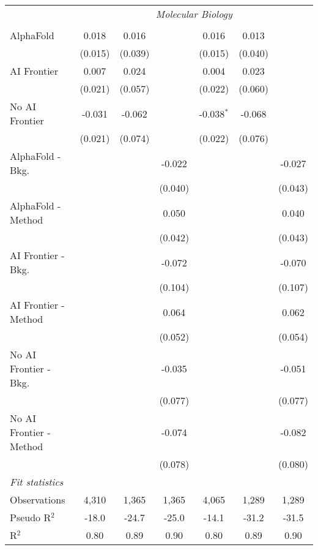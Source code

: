 \begin{tabular}{lcccccc}
 & \multicolumn{6}{c}{\textit{Molecular Biology}} \\ \\
   AlphaFold               & 0.018   & 0.016   &         & 0.016        & 0.013   &   \\   
                           & (0.015) & (0.039) &         & (0.015)      & (0.040) &   \\   
   AI Frontier             & 0.007   & 0.024   &         & 0.004        & 0.023   &   \\   
                           & (0.021) & (0.057) &         & (0.022)      & (0.060) &   \\   
   No AI Frontier          & -0.031  & -0.062  &         & -0.038$^{*}$ & -0.068  &   \\   
                           & (0.021) & (0.074) &         & (0.022)      & (0.076) &   \\   
   AlphaFold - Bkg.        &         &         & -0.022  &              &         & -0.027\\   
                           &         &         & (0.040) &              &         & (0.043)\\   
   AlphaFold - Method      &         &         & 0.050   &              &         & 0.040\\   
                           &         &         & (0.042) &              &         & (0.043)\\   
   AI Frontier - Bkg.      &         &         & -0.072  &              &         & -0.070\\   
                           &         &         & (0.104) &              &         & (0.107)\\   
   AI Frontier - Method    &         &         & 0.064   &              &         & 0.062\\   
                           &         &         & (0.052) &              &         & (0.054)\\   
   No AI Frontier - Bkg.   &         &         & -0.035  &              &         & -0.051\\   
                           &         &         & (0.077) &              &         & (0.077)\\   
   No AI Frontier - Method &         &         & -0.074  &              &         & -0.082\\   
                           &         &         & (0.078) &              &         & (0.080)\\   
   \midrule
   \emph{Fit statistics}\\
   Observations            & 4,310   & 1,365   & 1,365   & 4,065        & 1,289   & 1,289\\  
   Pseudo R$^2$            & -18.0   & -24.7   & -25.0   & -14.1        & -31.2   & -31.5\\  
   R$^2$                   & 0.80    & 0.89    & 0.90    & 0.80         & 0.89    & 0.90\\  
   

\end{tabular}
